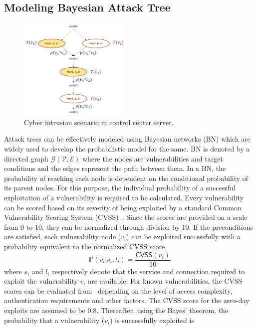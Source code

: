 \subsection{Modeling Bayesian Attack Tree}
\begin{figure}[htbp]
	\centering
	\includegraphics[width=0.48\textwidth]{fig-simpleattacktree.png}
	\caption{Cyber intrusion scenario in control center server.}
	\label{fig:example}
\end{figure}
Attack trees can be effectively modeled using Bayesian networks (BN) which are widely used to develop the probabilistic model for the same. BN is denoted by a directed graph $\mathcal{G}(\mathcal{V},\mathcal{E})$ where the nodes are vulnerabilities and target conditions and the edges represent the path between them. In a BN, the probability of reaching each node is dependent on the conditional probability of its parent nodes. For this purpose, the individual probability of a successful exploitation of a vulnerability is required to be calculated. Every vulnerability can be scored based on its severity of being exploited by a standard Common Vulnerability Scoring System (CVSS)~\cite{cvss}. Since the scores are provided on a scale from $0$ to $10$, they can be normalized through division by $10$. If the preconditions are satisfied, each vulnerability node ($v_i$) can be exploited successfully with a probability equivalent to the normalized CVSS score.
\begin{equation}
\mathbb{P}(v_i|s_i,l_i)=\dfrac{\mathsf{CVSS}(v_i)}{10}
\end{equation}
where $s_i$ and $l_i$ respectively denote that the service and connection required to exploit the vulnerability $v_i$ are available. For known vulnerabilities, the CVSS scores can be evaluated from~\cite{nist1,nist2} depending on the level of access complexity, authentication requirements and other factors. The CVSS score for the zero-day exploits are assumed to be $0.8$. Thereafter, using the Bayes' theorem, the probability that a vulnerability ($v_i$) is successfully exploited is
